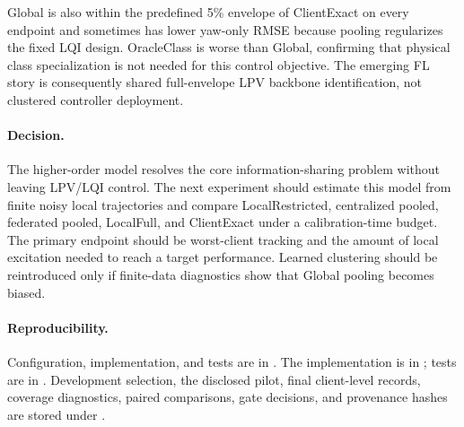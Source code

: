 Global is also within the predefined 5\% envelope of ClientExact on every
endpoint and sometimes has lower yaw-only RMSE because pooling regularizes the
fixed LQI design. OracleClass is worse than Global, confirming that physical
class specialization is not needed for this control objective. The emerging
FL story is consequently shared full-envelope LPV backbone identification,
not clustered controller deployment.

\paragraph{Decision.}
The higher-order model resolves the core information-sharing problem without
leaving LPV/LQI control. The next experiment should estimate this model from
finite noisy local trajectories and compare LocalRestricted, centralized
pooled, federated pooled, LocalFull, and ClientExact under a calibration-time
budget. The primary endpoint should be worst-client tracking and the amount of
local excitation needed to reach a target performance. Learned clustering
should be reintroduced only if finite-data diagnostics show that Global pooling
becomes biased.

\paragraph{Reproducibility.}
Configuration, implementation, and tests are in
. The implementation is in
; tests are in
. Development selection, the disclosed
pilot, final client-level records, coverage diagnostics, paired comparisons,
gate decisions, and provenance hashes are stored under .
